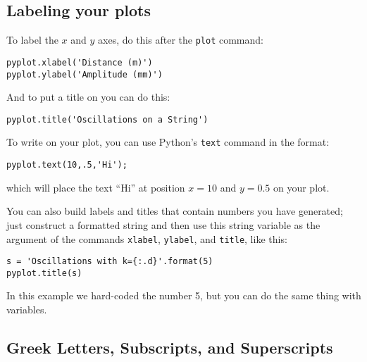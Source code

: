 \subsection*{Labeling your plots}
To label the $x$ and $y$ axes, do this after the {\tt plot} command:
\begin{Verbatim}
pyplot.xlabel('Distance (m)')
pyplot.ylabel('Amplitude (mm)')
\end{Verbatim}
And to put a title on you can do this:
\begin{Verbatim}
pyplot.title('Oscillations on a String')
\end{Verbatim}
  To write on your
plot, you can use Python's {\tt text} command in the format:
\begin{Verbatim}
pyplot.text(10,.5,'Hi');
\end{Verbatim}
which will place the text ``Hi'' at position $x=10$ and $y=0.5$ on
your plot.

You can also build labels and titles that contain numbers you have
generated; just construct a formatted string and then use this string
variable as the argument of the commands {\tt xlabel}, {\tt ylabel},
and {\tt title}, like this:
\begin{Verbatim}
s = 'Oscillations with k={:.d}'.format(5)
pyplot.title(s)
\end{Verbatim}
In this example we hard-coded the number 5, but you can do the same
thing with variables.


\subsection*{Greek Letters, Subscripts, and Superscripts}


